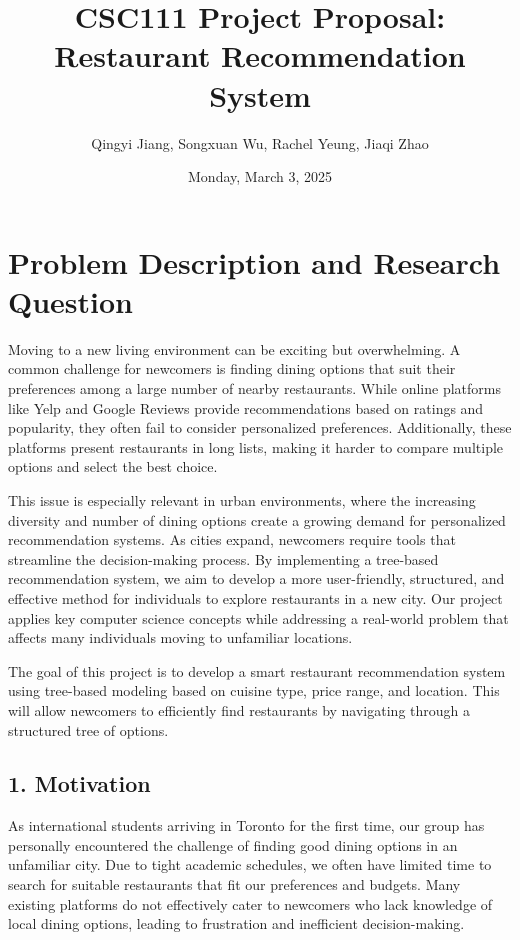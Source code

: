 \documentclass[fontsize=11pt]{article}
\title{CSC111 Project Proposal: Restaurant Recommendation System}
\author{Qingyi Jiang, Songxuan Wu, Rachel Yeung, Jiaqi Zhao}
\date{Monday, March 3, 2025}
\begin{document}
\maketitle

\section*{Problem Description and Research Question}
Moving to a new living environment can be exciting but overwhelming. A common challenge for newcomers is finding dining options that suit their preferences among a large number of nearby restaurants. While online platforms like Yelp and Google Reviews provide recommendations based on ratings and popularity, they often fail to consider personalized preferences. Additionally, these platforms present restaurants in long lists, making it harder to compare multiple options and select the best choice.

This issue is especially relevant in urban environments, where the increasing diversity and number of dining options create a growing demand for personalized recommendation systems. As cities expand, newcomers require tools that streamline the decision-making process. By implementing a tree-based recommendation system, we aim to develop a more user-friendly, structured, and effective method for individuals to explore restaurants in a new city. Our project applies key computer science concepts while addressing a real-world problem that affects many individuals moving to unfamiliar locations.

The goal of this project is to develop a smart restaurant recommendation system using tree-based modeling based on cuisine type, price range, and location. This will allow newcomers to efficiently find restaurants by navigating through a structured tree of options.

\subsection*{1. Motivation}
As international students arriving in Toronto for the first time, our group has personally encountered the challenge of finding good dining options in an unfamiliar city. Due to tight academic schedules, we often have limited time to search for suitable restaurants that fit our preferences and budgets. Many existing platforms do not effectively cater to newcomers who lack knowledge of local dining options, leading to frustration and inefficient decision-making.
\end{document}
